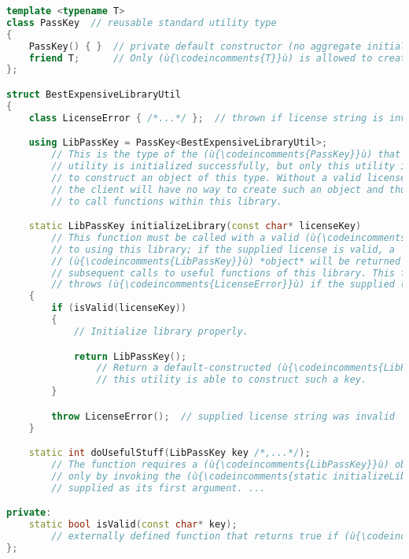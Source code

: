 \begin{lstlisting}[language=C++]
template <typename T>
class PassKey  // reusable standard utility type
{
    PassKey() { }  // private default constructor (no aggregate initialization)
    friend T;      // Only (ù{\codeincomments{T}}ù) is allowed to create this object.
};

struct BestExpensiveLibraryUtil
{
    class LicenseError { /*...*/ };  // thrown if license string is invalid

    using LibPassKey = PassKey<BestExpensiveLibraryUtil>;
        // This is the type of the (ù{\codeincomments{PassKey}}ù) that will be returned when this
        // utility is initialized successfully, but only this utility is able
        // to construct an object of this type. Without a valid license string,
        // the client will have no way to create such an object and thus no way
        // to call functions within this library.

    static LibPassKey initializeLibrary(const char* licenseKey)
        // This function must be called with a valid (ù{\codeincomments{licenseKey}}ù) string prior
        // to using this library; if the supplied license is valid, a
        // (ù{\codeincomments{LibPassKey}}ù) *object* will be returned for mandatory use in *all*
        // subsequent calls to useful functions of this library. This function
        // throws (ù{\codeincomments{LicenseError}}ù) if the supplied (ù{\codeincomments{licenseKey}}ù) string is invalid.
    {
        if (isValid(licenseKey))
        {
            // Initialize library properly.

            return LibPassKey();
                // Return a default-constructed (ù{\codeincomments{LibPassKey}}ù). Note that only
                // this utility is able to construct such a key.
        }

        throw LicenseError();  // supplied license string was invalid
    }

    static int doUsefulStuff(LibPassKey key /*,...*/);
        // The function requires a (ù{\codeincomments{LibPassKey}}ù) object, which can be constructed
        // only by invoking the (ù{\codeincomments{static initializeLibrary}}ù) function, to be
        // supplied as its first argument. ...

private:
    static bool isValid(const char* key);
        // externally defined function that returns true if (ù{\codeincomments{key}}ù) is valid
};
\end{lstlisting}

